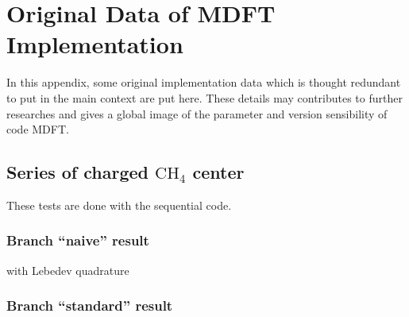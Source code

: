 
\chapter{Original Data of MDFT Implementation\label{chpt:original_data}}

In this appendix, some original implementation data which is thought
redundant to put in the main context are put here. These details may
contributes to further researches and gives a global image of the
parameter and version sensibility of code MDFT.


\section{Series of charged $\mathrm{C}\mathrm{H}_{4}$ center}

These tests are done with the sequential code.


\subsection{Branch ``naive'' result}

with Lebedev quadrature


\subsection{Branch ``standard'' result}
